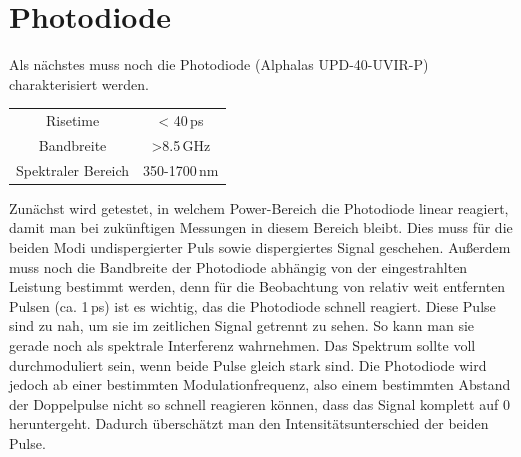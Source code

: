 \documentclass[bachelor,       %
               twoside,        %
               BCOR10mm,       %
               english,ngerman, %
               ]{GAUBM}
\begin{document}
\section{Photodiode}
Als nächstes muss noch die Photodiode (Alphalas UPD-40-UVIR-P) charakterisiert werden.
\begin{table}[!htb]
	\centering
	\begin{tabular}{|c|c|}
		\hline
		Risetime & < 40\,ps \\
		Bandbreite & >8.5\,GHz \\
		Spektraler Bereich & 350-1700\,nm \\
		\hline	
	\end{tabular}
\end{table}
Zunächst wird getestet, in welchem Power-Bereich die Photodiode linear reagiert, damit man bei zukünftigen Messungen in diesem Bereich bleibt.
Dies muss für die beiden Modi undispergierter Puls sowie dispergiertes Signal geschehen.
Außerdem muss noch die Bandbreite der Photodiode abhängig von der eingestrahlten Leistung bestimmt werden, denn für die Beobachtung von relativ weit entfernten Pulsen (ca. 1\,ps) ist es wichtig, das die Photodiode schnell reagiert.
Diese Pulse sind zu nah, um sie im zeitlichen Signal getrennt zu sehen.
So kann man sie gerade noch als spektrale Interferenz wahrnehmen.
Das Spektrum sollte voll durchmoduliert sein, wenn beide Pulse gleich stark sind.
Die Photodiode wird jedoch ab einer bestimmten Modulationfrequenz, also einem bestimmten Abstand der Doppelpulse nicht so schnell reagieren können, dass das Signal komplett auf 0 heruntergeht.
Dadurch überschätzt man den Intensitätsunterschied der beiden Pulse.
\end{document}
